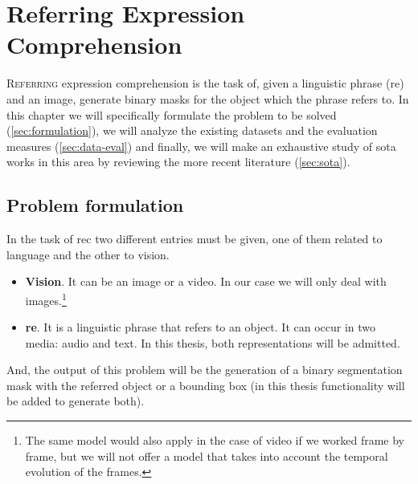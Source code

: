 

\chapter{Referring Expression Comprehension} \label{cha:rec}


\lettrine{R}{eferring} expression comprehension is the task of, given a
linguistic phrase (\gls{re}) and an image, generate binary masks for the object
which the phrase refers to. In this chapter we will specifically formulate the
problem to be solved (\vref{sec:formulation}), we will analyze the existing
datasets and the evaluation measures (\vref{sec:data-eval}) and finally, we
will make an exhaustive study of \gls{sota} works in this area by reviewing the
more recent literature (\vref{sec:sota}).


\section{Problem formulation} \label{sec:formulation}

In the task of \gls{rec} two different entries must be given, one of them
related to language and the other to vision.
\begin{itemize}
  \item \textbf{Vision}. It can be an image or a video. In our case we will
  only deal with images.\footnote{The same model would also apply in the case
    of video if we worked frame by frame, but we will not offer a model that
    takes into account the temporal evolution of the frames.}
  \item \textbf{\gls{re}}. It is a linguistic phrase that refers to an
  object. It can occur in two media: audio and text. In this thesis, both
  representations will be admitted.
\end{itemize}
And, the output of this problem will be the generation of a binary segmentation
mask with the referred object or a bounding box (in this thesis functionality
will be added to generate both).

